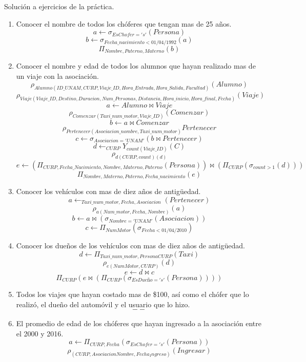 \documentclass{article}
\begin{document}
Solución a ejercicios de la práctica.\\
\begin{enumerate}
	\item Conocer el nombre de todos los chóferes que tengan mas de 25 años.\\
	$$a \leftarrow \sigma _{EsChofer = 's'} (Persona)$$
	$$b \leftarrow \sigma _{Fecha\_nacimiento < 01/04/1992}(a)$$
	$$\Pi_{Nombre,Paterno,Materno}(b)$$
	\item Conocer el nombre y edad de todos los alumnos que hayan realizado mas de un viaje con la asociación.\\
	$$\rho_{Alumno(ID\_UNAM,CURP,Viaje\_ID,Hora\_Entrada,Hora\_Salida,Facultad)}(Alumno)$$
    $$\rho_{Viaje(Viaje\_ID,Destino,Duracion,Num\_Personas,Distancia,Hora\_inicio,Hora\_final,Fecha)}(Viaje)$$
	$$a \leftarrow Alumno \bowtie Viaje$$
	$$\rho_{Comenzar(Taxi\_num\_motor,Viaje\_ID)}(Comenzar)$$
	$$b \leftarrow a \bowtie Comenzar$$
	$$\rho_{Pertenecer(Asociacion\_nombre,Taxi\_num\_motor)}Pertenecer$$
	$$c \leftarrow \sigma _{Asociacion = 'UNAM'}(b \bowtie Pertenecer)$$
	$$d \leftarrow _{CURP}Y_{count(Viaje\_ID)}(C)$$
	$$\rho _{d(CURP,count)(d)}$$
	$$e \leftarrow (\Pi_{CURP,Fecha\_Nacimiento,Nombre,Materno,Paterno}(Persona)) \bowtie (\Pi_{CURP}(\sigma _{count > 1}(d)))$$
	$$\Pi_{Nombre,Materno,Paterno,Fecha\_nacimiento}(e)$$
	\item  Conocer los vehículos con mas de diez años de antigüedad.\\
	$$a \leftarrow _{Taxi\_num\_motor,Fecha,Asociacion}(Pertenecer)$$
	$$\rho_{a(Num\_motor,Fecha,Nombre)}(a)$$
	$$b \leftarrow a \bowtie (\sigma_{Nombre = 'UNAM'}(Asociacion))$$
	$$c \leftarrow \Pi _{NumMotor}(\sigma_{Fecha < 01/04/2010})$$	
	\item Conocer los dueños de los vehículos con mas de diez años de antigüedad.\\
	$$d \leftarrow \Pi_{Taxi\_num\_motor,PersonaCURP}(Taxi)$$
	$$\rho_{e(NumMotor,CURP)}(d)$$
	$$e \leftarrow d \bowtie c$$
	$$\Pi_{CURP}(e \bowtie (\Pi_{CURP}(\sigma_{EsDueño = 's'}(Persona))))$$
	\item Todos los viajes que hayan costado mas de \$100, así como el chófer que lo realizó, el dueño del automóvil y el usuario que lo hizo.\\
	$$--$$
	\item  El promedio de edad de los chóferes que hayan ingresado a la asociación entre el 2000 y 2016.\\
	$$a \leftarrow \Pi _{CURP,Fecha}(\sigma_{EsChofer = 's'}(Persona))$$
	$$\rho_{(CURP,AsociacionNombre,Fecha_Ingreso)}(Ingresar)$$

\end{enumerate}
\end{document}
